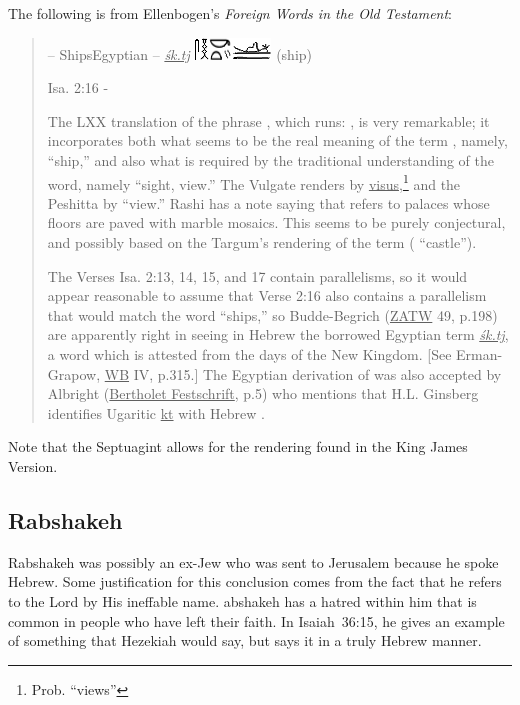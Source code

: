 The following is from Ellenbogen's \textit{Foreign Words in the Old Testament}:
\begin{quotation}
    {\noindent{} -- Ships\hfill Egyptian -- \uline{\textit{\'sk.tj}} \includegraphics[scale=1.1]{images/egt-ship} (ship)}
    
    {\noindent Isa. 2:16 -}
    
    The LXX translation of the phrase , which runs: , is very remarkable; it incorporates both what seems to be the real meaning of the term , namely,  ``ship,'' and also what is required by the traditional understanding of the word, namely  ``sight, view.'' The Vulgate renders  by \uline{visus},\footnote{Prob. ``views''} and the Peshitta by  ``view.'' Rashi has a note saying that  refers to palaces whose floors are paved with marble mosaics. This seems to be purely conjectural, and possibly based on the Targum's rendering of the term ( ``castle'').
    
    The Verses Isa. 2:13, 14, 15, and 17 contain parallelisms, so it would appear reasonable to assume that Verse 2:16 also contains a parallelism that would match the word  ``ships,'' so Budde-Begrich (\uline{ZATW} 49, p.198) are apparently right in seeing in Hebrew  the borrowed Egyptian term \uline{\textit{\'sk.tj}}, a word which is attested from the days of the New Kingdom. [See Erman-Grapow, \uline{WB} IV, p.315.] The Egyptian derivation of  was also accepted by Albright (\uline{Bertholet Festschrift}, p.5) who mentions that H.L. Ginsberg identifies Ugaritic \uline{kt} with Hebrew .
\end{quotation}

Note that the Septuagint allows for the rendering found in the King James Version.

\subsection{Rabshakeh}\label{app:rabshakeh}
Rabshakeh was possibly an ex-Jew who was sent to Jerusalem because he spoke Hebrew. Some justification for this conclusion comes from the fact that he refers to the Lord by His ineffable name. abshakeh has a hatred within him that is common in people who have left their faith. In Isaiah~36:15, he gives an example of something that Hezekiah would say, but says it in a truly Hebrew manner.
